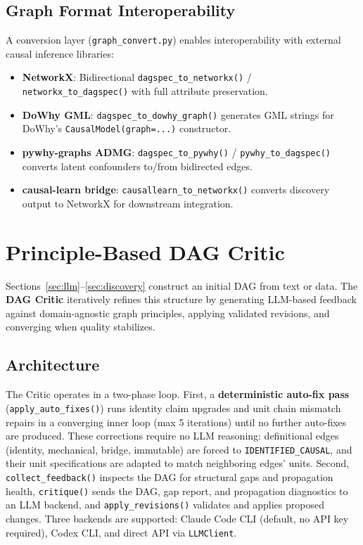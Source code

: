 \documentclass{article}
\begin{document}
\subsection{Graph Format Interoperability}

A conversion layer (\texttt{graph\_convert.py}) enables interoperability with external causal inference libraries:

\begin{itemize}[leftmargin=*, itemsep=1pt]
    \item \textbf{NetworkX}: Bidirectional \texttt{dagspec\_to\_networkx()} / \texttt{networkx\_to\_dagspec()} with full attribute preservation.
    \item \textbf{DoWhy GML}: \texttt{dagspec\_to\_dowhy\_graph()} generates GML strings for DoWhy's \texttt{CausalModel(graph=...)} constructor.
    \item \textbf{pywhy-graphs ADMG}: \texttt{dagspec\_to\_pywhy()} / \texttt{pywhy\_to\_dagspec()} converts latent confounders to/from bidirected edges.
    \item \textbf{causal-learn bridge}: \texttt{causallearn\_to\_networkx()} converts discovery output to NetworkX for downstream integration.
\end{itemize}

\section{Principle-Based DAG Critic}
\label{sec:critic}

Sections~\ref{sec:llm}--\ref{sec:discovery} construct an initial DAG from text or data. The \textbf{DAG Critic} iteratively refines this structure by generating LLM-based feedback against domain-agnostic graph principles, applying validated revisions, and converging when quality stabilizes.

\subsection{Architecture}

The Critic operates in a two-phase loop. First, a \textbf{deterministic auto-fix pass} (\texttt{apply\_auto\_fixes()}) runs identity claim upgrades and unit chain mismatch repairs in a converging inner loop (max 5 iterations) until no further auto-fixes are produced. These corrections require no LLM reasoning: definitional edges (identity, mechanical, bridge, immutable) are forced to \texttt{IDENTIFIED\_CAUSAL}, and their unit specifications are adapted to match neighboring edges' units. Second, \texttt{collect\_feedback()} inspects the DAG for structural gaps and propagation health, \texttt{critique()} sends the DAG, gap report, and propagation diagnostics to an LLM backend, and \texttt{apply\_revisions()} validates and applies proposed changes. Three backends are supported: Claude Code CLI (default, no API key required), Codex CLI, and direct API via \texttt{LLMClient}.
\end{document}
